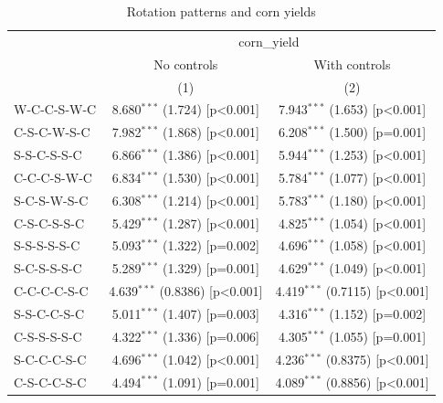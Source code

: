 
\begin{table}[H]
   \caption{\label{tab:corn_rot} Rotation patterns and corn yields}
   \bigskip
   \centering
   \scriptsize
   \renewcommand*{\arraystretch}{0.8}
   \begin{tabular}{lcc}
      \toprule
       & \multicolumn{2}{c}{corn\_yield}\\
                                      & No controls            & With controls \\   
                                      & (1)                    & (2)\\  
      \midrule 
      W-C-C-S-W-C                     & 8.680$^{***}$ (1.724) [p<0.001]  & 7.943$^{***}$ (1.653) [p<0.001]\\   
      C-S-C-W-S-C                     & 7.982$^{***}$ (1.868) [p<0.001]  & 6.208$^{***}$ (1.500) [p=0.001]\\   
      S-S-C-S-S-C                     & 6.866$^{***}$ (1.386) [p<0.001]  & 5.944$^{***}$ (1.253) [p<0.001]\\   
      C-C-C-S-W-C                     & 6.834$^{***}$ (1.530) [p<0.001]  & 5.784$^{***}$ (1.077) [p<0.001]\\   
      S-C-S-W-S-C                     & 6.308$^{***}$ (1.214) [p<0.001]  & 5.783$^{***}$ (1.180) [p<0.001]\\   
      C-S-C-S-S-C                     & 5.429$^{***}$ (1.287) [p<0.001]  & 4.825$^{***}$ (1.054) [p<0.001]\\   
      S-S-S-S-S-C                     & 5.093$^{***}$ (1.322) [p=0.002]  & 4.696$^{***}$ (1.058) [p<0.001]\\   
      S-C-S-S-S-C                     & 5.289$^{***}$ (1.329) [p=0.001]  & 4.629$^{***}$ (1.049) [p<0.001]\\   
      C-C-C-C-S-C                     & 4.639$^{***}$ (0.8386) [p<0.001] & 4.419$^{***}$ (0.7115) [p<0.001]\\   
      S-S-C-C-S-C                     & 5.011$^{***}$ (1.407) [p=0.003]  & 4.316$^{***}$ (1.152) [p=0.002]\\   
      C-S-S-S-S-C                     & 4.322$^{***}$ (1.336) [p=0.006]  & 4.305$^{***}$ (1.055) [p=0.001]\\   
      S-C-C-C-S-C                     & 4.696$^{***}$ (1.042) [p<0.001]  & 4.236$^{***}$ (0.8375) [p<0.001]\\   
      C-S-C-C-S-C                     & 4.494$^{***}$ (1.091) [p=0.001]  & 4.089$^{***}$ (0.8856) [p<0.001]\\   

\end{tabular}
\end{table}
